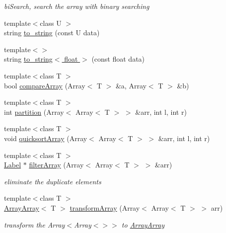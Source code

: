 \begin{DoxyCompactItemize}
\begin{DoxyCompactList}\small\item\em biSearch, search the array with binary searching \item\end{DoxyCompactList}\item 
{\footnotesize template$<$class U $>$ }\\string \hyperlink{namespaceHSF_ac32a245cfeb03fd2cc3976cef2171da1}{to\_\-string} (const U data)
\item 
{\footnotesize template$<$$>$ }\\string \hyperlink{namespaceHSF_abc82617f6255755f345594061a46c88b}{to\_\-string$<$ float $>$} (const float data)
\item 
{\footnotesize template$<$class T $>$ }\\bool \hyperlink{namespaceHSF_ac88bbd915979e88035d9a4d139569eb0}{compareArray} (Array$<$ T $>$ \&a, Array$<$ T $>$ \&b)
\item 
{\footnotesize template$<$class T $>$ }\\int \hyperlink{namespaceHSF_a23a03c0df9db8be9c1e6459ca665c05b}{partition} (Array$<$ Array$<$ T $>$ $>$ \&arr, int l, int r)
\item 
{\footnotesize template$<$class T $>$ }\\void \hyperlink{namespaceHSF_a6b9d255d6786f77b964d5963b79726c4}{quicksortArray} (Array$<$ Array$<$ T $>$ $>$ \&arr, int l, int r)
\item 
{\footnotesize template$<$class T $>$ }\\\hyperlink{namespaceHSF_ae65d72be782e989396ebe5ec6ae4c2b6}{Label} $\ast$ \hyperlink{namespaceHSF_ab2755628cd2d2f86aa337f1f19b1fb1c}{filterArray} (Array$<$ Array$<$ T $>$ $>$ \&arr)
\begin{DoxyCompactList}\small\item\em eliminate the duplicate elements \item\end{DoxyCompactList}\item 
{\footnotesize template$<$class T $>$ }\\\hyperlink{classHSF_1_1ArrayArray}{ArrayArray}$<$ T $>$ \hyperlink{namespaceHSF_a3160964f1c3812b1d7c9ba56328baed5}{transformArray} (Array$<$ Array$<$ T $>$ $>$ arr)
\begin{DoxyCompactList}\small\item\em transform the Array$<$Array$<$$>$$>$ to \hyperlink{classHSF_1_1ArrayArray}{ArrayArray} \item\end{DoxyCompactList}\item 

\end{DoxyCompactItemize}
